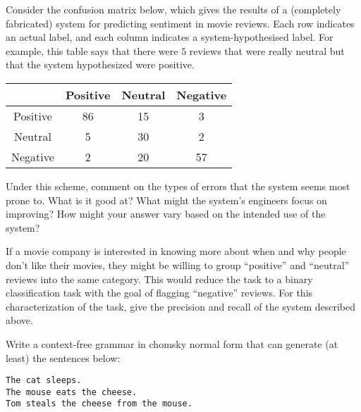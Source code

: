 \documentclass[11pt,letterpaper,boxed]{hmcpset}
\begin{document}
\begin{solution}
\vspace{3cm}
\end{solution}

\begin{problem}
Consider the confusion matrix below, which gives the results of a
(completely fabricated) system for predicting sentiment in movie
reviews. Each row indicates an actual label, and each column indicates
a system-hypothesised label. For example, this table says that there
were $5$ reviews that were really neutral but that the system
hypothesized were positive.

\begin{center}
\begin{tabular}{|c|c|c|c|}
\hline
 & Positive & Neutral & Negative \\
\hline
Positive & 86 & 15 & 3 \\
Neutral & 5 & 30 & 2 \\
Negative & 2 & 20 & 57 \\
\hline
\end{tabular}
\end{center}

Under this scheme, comment on the types of errors that the system
seems most prone to. What is it good at? What might the system's
engineers focus on improving? How might your answer vary based on the
intended use of the system? 
\end{problem}

\begin{solution}
\vspace{3cm}
\end{solution}

\begin{problem}
If a movie company is interested in knowing more about when and why people
don't like their movies, they might be willing to group ``positive''
and ``neutral'' reviews into the same category. This would reduce the
task to a binary classification task with the goal of flagging
``negative'' reviews. For this characterization of the task, give the
precision and recall of the system described above. 
\end{problem}

\begin{solution}
\vspace{3cm}
\end{solution}
\pagebreak

\begin{problem}
Write a context-free grammar in chomsky normal form that can generate (at least) the
sentences below:

\begin{verbatim}
The cat sleeps.
The mouse eats the cheese.
Tom steals the cheese from the mouse.
\end{verbatim}
\end{problem}
\end{document}
